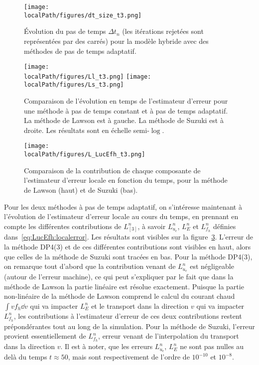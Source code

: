 \begin{figure}[h]
  \centering
  \texttt{[image: \\localPath/figures/dt\_size\_t3.png]}
  \caption{Évolution du pas de temps $\Delta t_n$ (les itérations rejetées sont représentées par des carrés) pour la modèle hybride avec des méthodes de pas de temps adaptatif.} 
  \label{fig:compare:dt_and_error}
\end{figure}

\begin{figure}[h]
  \centering
  \texttt{[image: \\localPath/figures/Ll\_t3.png]}
  \texttt{[image: \\localPath/figures/Ls\_t3.png]}
  \caption{Comparaison de l'évolution en temps de l'estimateur d'erreur pour une méthode à pas de temps constant et à pas de temps adaptatif. La méthode de Lawson est à gauche. La méthode de Suzuki est à droite. Les résultats sont en échelle semi-$\log$.}
  \label{fig:compare:error:dtc}
\end{figure}
\begin{figure}[h]
  \centering
  \texttt{[image: \\localPath/figures/L\_LucEfh\_t3.png]}
  \caption{Comparaison de la contribution de chaque composante de l'estimateur d'erreur locale en fonction du temps, pour la méthode de Lawson (haut) et de Suzuki (bas).}
  \label{fig:compare:error:LucEfh}
\end{figure}

Pour les deux méthodes à pas de temps adaptatif, on s'intéresse maintenant à l'évolution de l'estimateur d'erreur locale au cours du temps, en prennant en compte les différentes contributions de $L^n_{[3]}$, à savoir $L^n_{u_c}$, $L^n_{E}$ et $L^n_{f_h}$ définies dans~\eqref{eq:LucEfh:localerror}. Les résultats sont visibles sur la figure~\ref{fig:compare:error:LucEfh}. L'erreur de la méthode DP4(3) et de ces différentes contributions sont visibles en haut, alors que celles de la méthode de Suzuki sont tracées en bas. Pour la méthode DP4(3), on remarque tout d'abord que la contribution venant de $L^n_{u_c}$ est négligeable (autour de l'erreur machine), ce qui peut s'expliquer par le fait que dans la méthode de Lawson la partie linéaire est résolue exactement. Puisque la partie non-linéaire de la méthode de Lawson comprend le calcul du courant chaud $\int vf_h\dd{v}$ qui va impacter $L^n_E$ et le transport dans la direction $v$ qui va impacter $L^n_{f_h}$, les contributions à l'estimateur d'erreur de ces deux contributions restent prépondérantes tout au long de la simulation. Pour la méthode de Suzuki, l'erreur provient essentiellement de $L^n_{f_h}$, erreur venant de l'interpolation du transport dans la direction $v$. Il est à noter, que les erreurs $L^n_{u_c}$, $L^n_{E}$ ne sont pas nulles au delà du temps $t\approx 50$, mais sont respectivement de l'ordre de $10^{-10}$ et $10^{-8}$.

